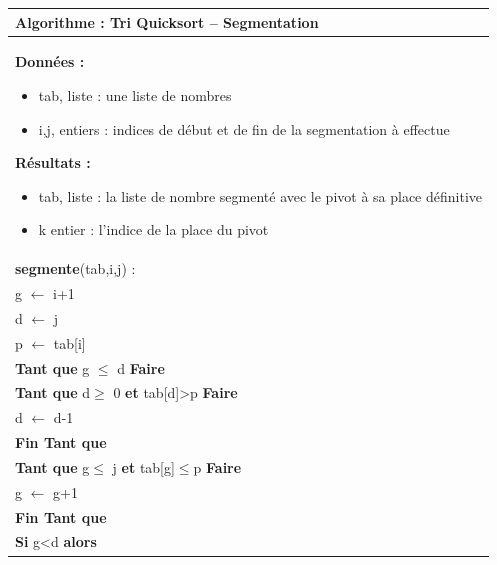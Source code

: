 \documentclass[10pt]{article}
\begin{document}
\begin{pseudo}
\begin{center}
\begin{tabular}{p{}}
\hline
\textbf{Algorithme :} Tri Quicksort -- Segmentation\\
\hline
\textbf{Données :}
\begin{itemize}
\item \textsf{tab}, liste : une liste de nombres
\item \textsf{i,j}, entiers : indices de début et de fin de la segmentation à effectue
\end{itemize}
\textbf{Résultats :} 
\begin{itemize}
\item \textsf{tab}, liste : la liste de nombre segmenté avec le pivot à sa place définitive
\item \textsf{k} entier : l'indice de la place du pivot
\end{itemize}
\\
\textbf{segmente}(\textsf{tab,i,j}) :\\
\hspace{.4cm} \textsf{g $\leftarrow$ i+1 }\\
\hspace{.4cm} \textsf{d $\leftarrow$ j}\\
\hspace{.4cm} \textsf{p $\leftarrow$ tab[i]}\\
\hspace{.4cm} \textbf{Tant que} \textsf{g $\leq$ d} \textbf{Faire} \\
\hspace{.8cm} \textbf{Tant que} \textsf{d$\geq$ 0} \textbf{et} \textsf{tab[d]>p} \textbf{Faire} \\
\hspace{1.2cm} \textsf{d $\leftarrow$ d-1}\\  
\hspace{.8cm} \textbf{Fin Tant que}  \\
\hspace{.8cm} \textbf{Tant que} \textsf{g$\leq$ j} \textbf{et} \textsf{tab[g]$\leq$p} \textbf{Faire} \\
\hspace{1.2cm} \textsf{g $\leftarrow$ g+1}\\  
\hspace{.8cm} \textbf{Fin Tant que}  \\
\hspace{.8cm} \textbf{Si} \textsf{g<d} \textbf{alors} \\

\end{tabular}
\end{center}
\end{pseudo}
\end{document}
